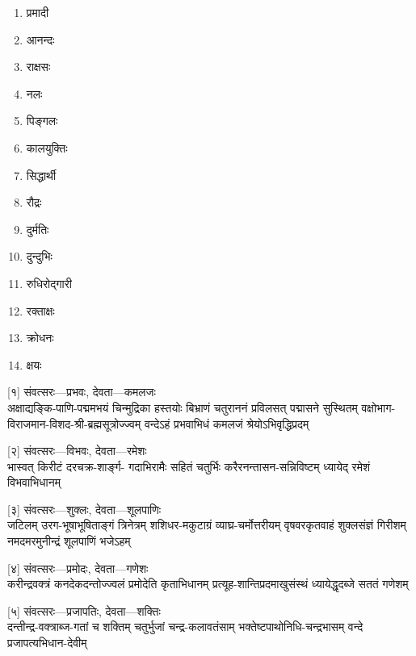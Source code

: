 \begin{multicols}{2}
\begin{enumerate}
\item प्रमादी 
\item आनन्दः 
\item राक्षसः 
\item नलः 
\item पिङ्गलः 
\item कालयुक्तिः 
\item सिद्धार्थी 
\item रौद्रः 
\item दुर्मतिः 
\item दुन्दुभिः 
\item रुधिरोद्गारी 
\item रक्ताक्षः 
\item क्रोधनः 
\item क्षयः
\end{enumerate}
\end{multicols}


[१] संवत्सरः—प्रभवः, देवता—कमलजः\\

\fourlineindentedshloka
{अक्षाद्यङ्कि-पाणि-पद्ममभयं चिन्मुद्रिका हस्तयोः}
{बिभ्राणं चतुराननं प्रविलसत् पद्मासने सुस्थितम्}
{वक्षोभाग-विराजमान-विशद-श्री-ब्रह्मसूत्रोज्ज्वम्}
{वन्देऽहं प्रभवाभिधं कमलजं श्रेयोऽभिवृद्धिप्रदम्}

[२] संवत्सरः—विभवः, देवता—रमेशः\\

\fourlineindentedshloka
{भास्वत् किरीटं दरचक्र-शार्ङ्ग-}
{गदाभिरामैः सहितं चतुर्भिः}
{करैरनन्तासन-सन्निविष्टम्}
{ध्यायेद् रमेशं विभवाभिधानम्}

[३] संवत्सरः—शुक्लः, देवता—शूलपाणिः\\

\fourlineindentedshloka
{जटिलम् उरग-भूषाभूषिताङ्गं त्रिनेत्रम्}
{शशिधर-मकुटाग्रं व्याघ्र-चर्मोत्तरीयम्}
{वृषवरकृतवाहं शुक्लसंज्ञं गिरीशम्}
{नमदमरमुनीन्द्रं शूलपाणिं भजेऽहम्}

[४] संवत्सरः—प्रमोदः, देवता—गणेशः\\

\twolineshloka
{करीन्द्रवक्त्रं कनदेकदन्तोज्ज्वलं प्रमोदेति कृताभिधानम्}
{प्रत्यूह-शान्तिप्रदमाखुसंस्थं ध्यायेद्धृदब्जे सततं गणेशम्} %

[५] संवत्सरः—प्रजापतिः, देवता—शक्तिः\\

\fourlineindentedshloka
{दन्तीन्द्र-वक्त्राब्ज-गतां च शक्तिम्}
{चतुर्भुजां चन्द्र-कलावतंसाम्}
{भक्तेष्टपाथोनिधि-चन्द्रभासम्}
{वन्दे प्रजापत्यभिधान-देवीम्}

